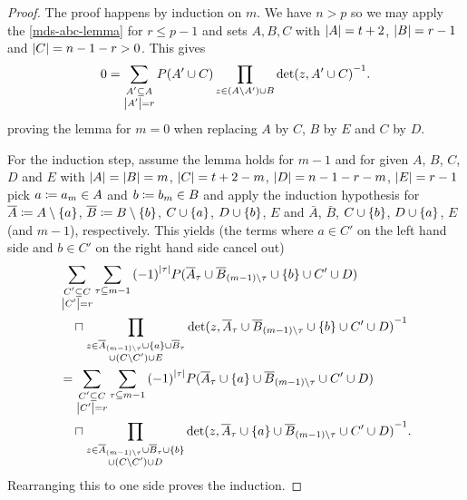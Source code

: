 \begin{proof}
    The proof happens by induction on $m$.
    We have $n>p$ so we may apply the \autoref{mds-abc-lemma} for $r\leq p-1$ and sets $A,B,C$ with $\left\vert{A}\right\vert=t+2$, $\left\vert{B}\right\vert=r-1$ and $\left\vert{C}\right\vert=n-1-r>0$.
    This gives
    $$ 0 = \sum_{\substack{A'\subseteq A\\\left\vert{A'}\right\vert=r}}{P(A'\cup C)\prod_{z\in (A\setminus A')\cup B}{{\det(z,A'\cup C)}^{-1}}}. $$
    proving the lemma for $m=0$ when replacing $A$ by $C$, $B$ by $E$ and $C$ by $D$.

    For the induction step, assume the lemma holds for $m-1$ and for given $A$, $B$, $C$, $D$ and $E$ with $\left\vert{A}\right\vert=\left\vert{B}\right\vert=m$, $\left\vert{C}\right\vert=t+2-m$, $\left\vert{D}\right\vert=n-1-r-m$, $\left\vert{E}\right\vert=r-1$ pick $a\mathrel{\mathrel{\mathop:}\mkern-1.2mu=} a_m\in A$ and $b\mathrel{\mathrel{\mathop:}\mkern-1.2mu=} b_m\in B$ and apply the induction hypothesis for $\bar{A}\defeq A\setminus\set{a}$, $\bar{B}\defeq B\setminus\set{b}$, $C\setjoin\set{a}$, $D\setjoin\set{b}$, $E$ and $\bar{A}$, $\bar{B}$, $C\setjoin\set{b}$, $D\setjoin\set{a}$, $E$ (and $m-1$), respectively. 
    This yields (the terms where $a\in C'$ on the left hand side and $b\in C'$ on the right hand side cancel out) 
    \begin{align*}
 & \sum_{\substack{C'\setleq C                                                                   \\ \card{C'}=r}}\sum_{\tau\setleq m-1}{{(-1)}^{\card{\tau}}P(\bar{A}_{\tau}\setjoin \bar{B}_{(m-1)\setminus\tau}\setjoin\set{b}\setjoin C'\setjoin D)}\\
 & \quad\setprod\prod_{\substack{z\in \bar{A}_{(m-1)\setminus\tau}\setjoin\set{a}\setjoin \bar{B}_{\tau} \\ \setjoin(C\setminus C')\setjoin E}}{{\det(z,\bar{A}_{\tau}\setjoin \bar{B}_{(m-1)\setminus\tau}\setjoin\set{b}\setjoin C'\setjoin D)}^{-1}}\\
 & = \sum_{\substack{C'\setleq C                                                               \\
         \card{C'}=r}}\sum_{\tau\setleq m-1}{{(-1)}^{\card{\tau}}P(\bar{A}_{\tau}\setjoin\set{a}\setjoin \bar{B}_{(m-1)\setminus\tau}\setjoin C'\setjoin D)}\\
 & \quad\setprod\prod_{\substack{z\in \bar{A}_{(m-1)\setminus\tau}\setjoin \bar{B}_{\tau}\setjoin\set{b} \\\setjoin(C\setminus C')\setjoin D}}{{\det(z,\bar{A}_{\tau}\setjoin\set{a}\setjoin \bar{B}_{(m-1)\setminus\tau}\setjoin C'\setjoin D)}^{-1}}.
    \end{align*}
    Rearranging this to one side proves the induction.
\end{proof}

